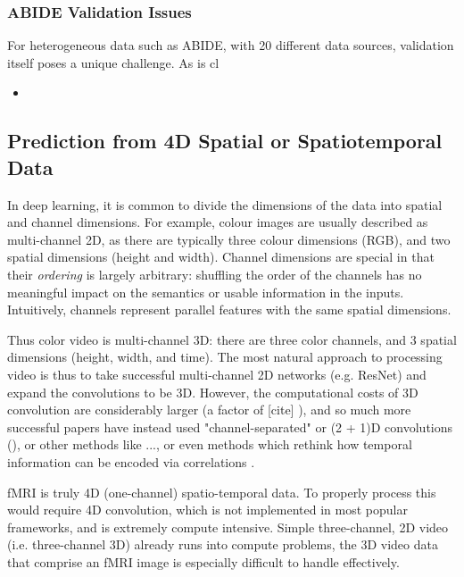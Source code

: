\documentclass[10pt]{article}
\begin{document}
\subsubsection{ABIDE Validation Issues}

For heterogeneous data such as ABIDE, with 20 different data sources, validation itself poses a
unique challenge. As is
cl

\begin{itemize}
  \item
\end{itemize}


\subsection{Prediction from 4D Spatial or Spatiotemporal Data}

In deep learning, it is common to divide the dimensions of the data into spatial and channel
dimensions. For example, colour images are usually described as multi-channel 2D, as there are
typically three colour dimensions (RGB), and two spatial dimensions (height and width). Channel
dimensions are special in that their \emph{ordering} is largely arbitrary: shuffling the order of
the channels has no meaningful impact on the semantics or usable information in the inputs.
Intuitively, channels represent parallel features with the same spatial dimensions.

Thus color video is multi-channel 3D: there are three color channels, and 3 spatial dimensions
(height, width, and time). The most natural approach to processing video is thus to take successful
multi-channel 2D networks (e.g. ResNet) and expand the convolutions to be 3D. However, the
computational costs of 3D convolution are considerably larger (a factor of [cite]
\citet{tranCloserLookSpatiotemporal2018}), and so much more successful papers have instead used
"channel-separated" or (2 + 1)D convolutions (\citet{tranCloserLookSpatiotemporal2018}), or other
methods like ..., or even methods which rethink how temporal information can be encoded via
correlations \cite{wangVideoModelingCorrelation2020}.

fMRI is truly 4D (one-channel) spatio-temporal data. To properly process this would require 4D
convolution, which is not implemented in most popular frameworks, and is extremely compute
intensive. Simple three-channel, 2D video (i.e. three-channel 3D) already runs into compute
problems, the 3D video data that comprise an fMRI image is especially difficult to handle
effectively.
\end{document}
